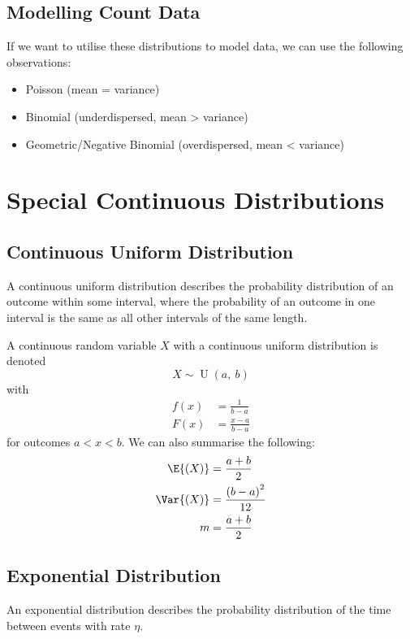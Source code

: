 \documentclass{article}
\begin{document}
\begin{multicols}{3}
    \subsection{Modelling Count Data}
    If we want to utilise these distributions to model data, we can use the following observations:
    \begin{itemize}
        \item Poisson (mean = variance)
        \item Binomial (underdispersed, mean > variance)
        \item Geometric/Negative Binomial (overdispersed, mean < variance)
    \end{itemize}
    \section{Special Continuous Distributions}
    \subsection{Continuous Uniform Distribution}
    A continuous uniform distribution describes the probability distribution of an outcome within some
    interval, where the probability of an outcome in one interval is the same as all other intervals of the same length.

    A continuous random variable \(X\) with a continuous uniform distribution is denoted
    \begin{equation*}
        X \sim \operatorname{U}{\left( a,\: b \right)}
    \end{equation*}
    with
    \begin{align*}
        f\left( x \right) & = \frac{1}{b - a}     \\
        F\left( x \right) & = \frac{x - a}{b - a}
    \end{align*}
    for outcomes \(a < x < b\).
    We can also summarise the following:
    \begin{align*}
        \E{\left( X \right)}   & = \frac{a + b}{2}                   \\
        \Var{\left( X \right)} & = \frac{\left( b - a \right)^2}{12} \\
        m                      & = \frac{a + b}{2}
    \end{align*}
    \subsection{Exponential Distribution}
    An exponential distribution describes the probability distribution of the time between events with rate \(\eta\).


\end{multicols}
\end{document}
